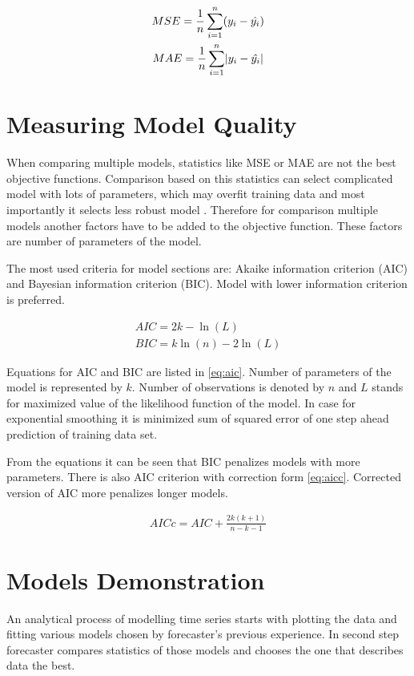     \begin{gather} \label{eq:accuracy-mse}
         MSE = \frac{1}{n} \sum_{i=1}^{n}(y_i - \hat{y_i}) \\
         MAE = \frac{1}{n} \sum_{i=1}^{n} \abs{y_i - \hat{y_i}} \label{eq:accuracy-mae}
    \end{gather}

    \section{Measuring Model Quality} \label{sec:model-quality}
    When comparing multiple models, statistics like MSE or MAE are not the best objective functions. Comparison
    based on this statistics can select complicated model with lots of parameters, which may overfit training data
    and most importantly it selects less robust model \cite{cipra}. Therefore for comparison multiple models another
    factors have to be added to the objective function. These factors are number of parameters of the model.

    The most used criteria for model sections are: Akaike information criterion (AIC) and Bayesian information
    criterion (BIC). Model with lower information criterion is preferred.

    \begin{gather} \label{eq:aic}
        AIC = 2 k - \ln(L) \\ \nonumber
        BIC = k \ln(n) - 2 \ln(L)
    \end{gather}

    Equations for AIC and BIC are listed in \ref{eq:aic}. Number of parameters of the model is represented by $k$.
    Number of observations is denoted by $n$ and $L$ stands for maximized value of the likelihood function of the
    model. In case for exponential smoothing it is minimized sum of squared error of one step ahead prediction of
    training data set.

    From the equations it can be seen that BIC penalizes models with more parameters. There is also AIC criterion with
    correction form \ref{eq:aicc}. Corrected version of AIC more penalizes longer models.

    \begin{eqnarray} \label{eq:aicc}
        AICc = AIC + \frac{2k(k+1)}{n-k-1}
    \end{eqnarray}

    \section{Models Demonstration} \label{sec:models-demonstration}
    An analytical process of modelling time series starts with plotting the data and fitting various models chosen by
    forecaster's previous experience. In second step forecaster compares statistics of those models and chooses the one
    that describes data the best.

